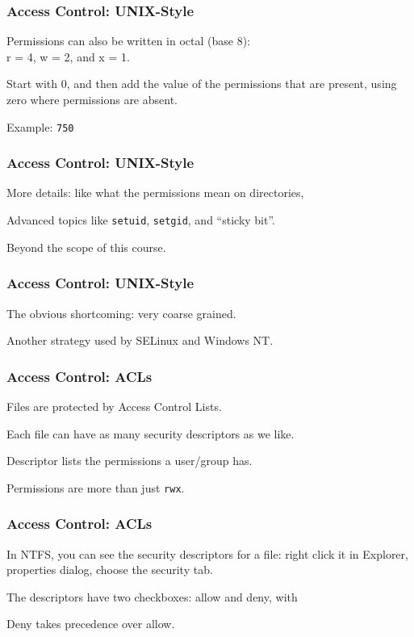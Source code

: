 \begin{frame}
\frametitle{Access Control: UNIX-Style}


Permissions can also be written in octal (base 8): \\
\quad r = 4, w = 2, and x = 1. 

Start with 0, and then add the value of the  permissions that are present, using zero where permissions are absent. 

Example: \texttt{750} 


\end{frame}

\begin{frame}
\frametitle{Access Control: UNIX-Style}


More details: like what the permissions mean on directories, 

Advanced topics like \texttt{setuid}, \texttt{setgid}, and ``sticky bit''.

Beyond the scope of this course.


\end{frame}

\begin{frame}
\frametitle{Access Control: UNIX-Style}


The obvious shortcoming: very coarse grained.

Another strategy used by SELinux and Windows NT.


\end{frame}

\begin{frame}
\frametitle{Access Control: ACLs}


Files are protected by Access Control Lists.

Each file can have as many security descriptors as we like.

Descriptor lists the permissions a user/group has.

Permissions are more than just \texttt{rwx}.


\end{frame}

\begin{frame}
\frametitle{Access Control: ACLs}


In NTFS, you can see the security descriptors for a file: right click it in Explorer, properties dialog, choose the security tab. 

The descriptors have two checkboxes: allow and deny, with 

Deny takes precedence over allow.


\end{frame}

